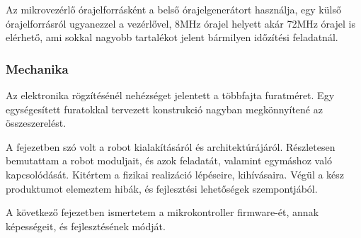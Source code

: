 Az mikrovezérlő órajelforrásként a belső órajelgenerátort használja, egy külső
órajelforrásról ugyanezzel a vezérlővel, 8MHz órajel helyett akár 72MHz órajel is
elérhető, ami sokkal nagyobb tartalékot jelent bármilyen időzítési feladatnál.

\subsubsection{Mechanika}

Az elektronika rögzítésénél nehézséget jelentett a többfajta furatméret. Egy
egységesített furatokkal tervezett konstrukció nagyban megkönnyítené az
összeszerelést.

\bigskip

A fejezetben szó volt a robot kialakításáról és architektúrájáról. Részletesen
bemutattam a robot moduljait, és azok feladatát, valamint egymáshoz való
kapcsolódását. Kitértem a fizikai realizáció lépéseire, kihívásaira. Végül a kész
produktumot elemeztem hibák, és fejlesztési lehetőségek szempontjából.

A következő fejezetben ismertetem a mikrokontroller firmware-ét, annak
képességeit, és fejlesztésének módját. 

